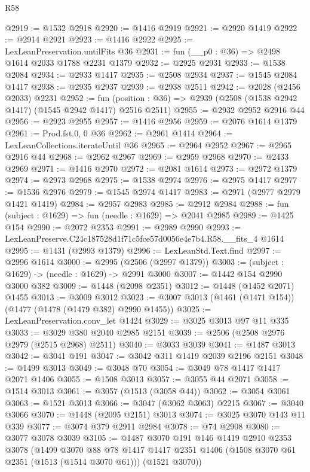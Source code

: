 \begin{lexlean}{R58}
\begin{coremodule}
{{@2919 := @1532 @2918
@2920 := @1416 @2919
@2921 := @2920 @1419
@2922 := @2914 @2921
@2923 := @1416 @2922
@2925 := LexLeanPreservation.untilFits @36
@2931 := fun (__p0 : @36) => @2498 @1614 @2033 @1788 @2231 @1379
@2932 := @2925 @2931
@2933 := @1538 @2084
@2934 := @2933 @1417
@2935 := @2508 @2934
@2937 := @1545 @2084 @1417
@2938 := @2935 @2937
@2939 := @2938 @2511
@2942 := @2028 (@2456 @2033) @2231
@2952 := fun (position : @36) => @2939 (@2508 (@1538 @2942 @1417) (@1545 @2942 @1417) @2516 @2511)
@2955 := @2932 @2952 @2916 @44
@2956 := @2923 @2955
@2957 := @1416 @2956
@2959 := @2076 @1614 @1379
@2961 := Prod.fst.{0, 0} @36
@2962 := @2961 @1414
@2964 := LexLeanCollections.iterateUntil @36
@2965 := @2964 @2952
@2967 := @2965 @2916 @44
@2968 := @2962 @2967
@2969 := @2959 @2968
@2970 := @2433 @2969
@2971 := @1416 @2970
@2972 := @2081 @1614
@2973 := @2972 @1379
@2974 := @2973 @2968
@2975 := @1538 @2974
@2976 := @2975 @1417
@2977 := @1536 @2976
@2979 := @1545 @2974 @1417
@2983 := @2971 (@2977 @2979 @1421 @1419)
@2984 := @2957 @2983
@2985 := @2912 @2984
@2988 := fun (subject : @1629) => fun (needle : @1629) => @2041 @2985
@2989 := @1425 @154
@2990 := @2072 @2353
@2991 := @2989 @2990
@2993 := LexLeanPreserve.C24c187528d1f71c5fce57d0056e4e7b4.R58.__fits_4 @1614
@2995 := @1431 (@2993 @1379)
@2996 := LexLeanStd.Text.find
@2997 := @2996 @1614
@3000 := @2995 (@2506 (@2997 @1379))
@3003 := (subject : @1629) -> (needle : @1629) -> @2991 @3000
@3007 := @1442 @154 @2990 @3000 @382
@3009 := @1448 (@2098 @2351)
@3012 := @1448 (@1452 @2071) @1455
@3013 := @3009 @3012
@3023 := @3007 @3013 (@1461 (@1471 @154)) (@1477 (@1478 (@1479 @382) @2990 @1455))
@3025 := LexLeanPreservation.conv_let @1424
@3029 := @3025 @3013 @97 @11 @335
@3033 := @3029 @380 @2040 @2985 @2151
@3039 := @2506 (@2508 @2976 @2979 (@2515 @2968) @2511)
@3040 := @3033 @3039
@3041 := @1487 @3013
@3042 := @3041 @191
@3047 := @3042 @311 @1419 @2039 @2196 @2151
@3048 := @1499 @3013
@3049 := @3048 @70
@3054 := @3049 @78 @1417 @1417 @2071 @1406
@3055 := @1508 @3013
@3057 := @3055 @44 @2071
@3058 := @1514 @3013
@3061 := @3057 (@1513 (@3058 @44))
@3062 := @3054 @3061
@3063 := @1521 @3013
@3066 := @3047 (@3062 @3063) @2215
@3067 := @3040 @3066
@3070 := @1448 (@2095 @2151) @3013
@3074 := @3025 @3070 @143 @11 @339
@3077 := @3074 @379 @2911 @2984
@3078 := @74 @2908
@3080 := @3077 @3078 @3039
@3105 := @1487
    @3070
    @191
    @146
    @1419
    @2910
    @2353
    @3078
    (@1499
      @3070
      @88
      @78
      @1417
      @1417
      @2351
      @1406
      (@1508 @3070 @61 @2351 (@1513 (@1514 @3070 @61)))
      (@1521 @3070))
}}
\end{coremodule}
\end{lexlean}
